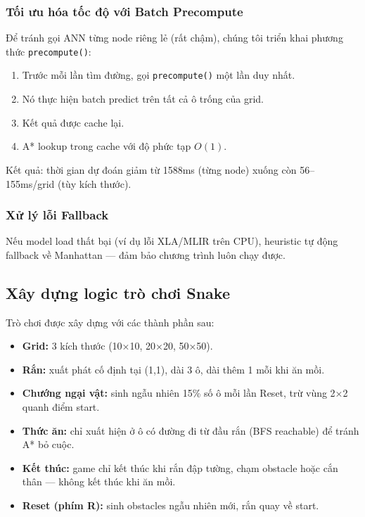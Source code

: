 \documentclass[12pt,a4paper]{article}
\begin{document}
\subsubsection{Tối ưu hóa tốc độ với Batch Precompute}

Để tránh gọi ANN từng node riêng lẻ (rất chậm), chúng tôi triển khai phương thức \lstinline{precompute()}:

\begin{enumerate}
    \item Trước mỗi lần tìm đường, gọi \lstinline{precompute()} một lần duy nhất.
    \item Nó thực hiện batch predict trên tất cả ô trống của grid.
    \item Kết quả được cache lại.
    \item A* lookup trong cache với độ phức tạp $O(1)$.
\end{enumerate}

Kết quả: thời gian dự đoán giảm từ 1588ms (từng node) xuống còn 56--155ms/grid (tùy kích thước).

\subsubsection{Xử lý lỗi Fallback}

Nếu model load thất bại (ví dụ lỗi XLA/MLIR trên CPU), heuristic tự động fallback về Manhattan --- đảm bảo chương trình luôn chạy được.

\subsection{Xây dựng logic trò chơi Snake}

Trò chơi được xây dựng với các thành phần sau:

\begin{itemize}
    \item \textbf{Grid:} 3 kích thước (10×10, 20×20, 50×50).
    \item \textbf{Rắn:} xuất phát cố định tại (1,1), dài 3 ô, dài thêm 1 mỗi khi ăn mồi.
    \item \textbf{Chướng ngại vật:} sinh ngẫu nhiên 15\% số ô mỗi lần Reset, trừ vùng 2×2 quanh điểm start.
    \item \textbf{Thức ăn:} chỉ xuất hiện ở ô có đường đi từ đầu rắn (BFS reachable) để tránh A* bỏ cuộc.
    \item \textbf{Kết thúc:} game chỉ kết thúc khi rắn đập tường, chạm obstacle hoặc cắn thân --- không kết thúc khi ăn mồi.
    \item \textbf{Reset (phím R):} sinh obstacles ngẫu nhiên mới, rắn quay về start.
\end{itemize}
\end{document}
